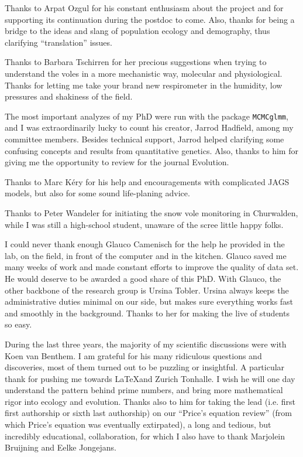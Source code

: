 Thanks to Arpat Ozgul for his constant enthusiasm about the project and for supporting its continuation during the postdoc to come. Also, thanks for being a bridge to the ideas and slang of population ecology and demography, thus clarifying ``translation'' issues. 

Thanks to Barbara Tschirren for her precious suggestions when trying to understand the voles in a more mechanistic way, molecular and physiological. Thanks for letting me take your brand new respirometer in the humidity, low pressures and shakiness of the field. 

The most important analyzes of my PhD were run with the package \texttt{MCMCglmm}, and I was extraordinarily lucky to count his creator, Jarrod Hadfield, among my committee members. Besides technical support, Jarrod helped clarifying some confusing concepts and results from quantitative genetics. Also, thanks to him for giving me the opportunity to review for the journal Evolution. 

Thanks to Marc K\'{e}ry for his help and encouragements with complicated JAGS models, but also for some sound life-planing advice. 

Thanks to Peter Wandeler for initiating the snow vole monitoring in Churwalden, while I was still a high-school student, unaware of the scree little happy folks. 

I could never thank enough Glauco Camenisch for the help he provided in the lab, on the field, in front of the computer and in the kitchen. Glauco saved me many weeks of work and made constant efforts to improve the quality of data set. He would deserve to be awarded a good share of this PhD.
With Glauco, the other backbone of the research group is Ursina Tobler. 
Ursina always keeps the administrative duties minimal on our side, but makes sure everything works fast and smoothly in the background. Thanks to her for making the live of students so easy. 

During the last three years, the majority of my scientific discussions were with Koen van Benthem. I am grateful for his many ridiculous questions and discoveries, most of them turned out to be puzzling or insightful. A particular thank for pushing me towards \LaTeX and Zurich Tonhalle. 
I wish he will one day understand the pattern behind prime numbers, and bring more mathematical rigor into ecology and evolution. 
Thanks also to him for taking the lead (i.e. first first authorship or sixth last authorship) on our ``Price's equation review'' (from which Price's equation was eventually extirpated), a long and tedious, but incredibly educational, collaboration, for which I also have to thank Marjolein Bruijning and Eelke Jongejans.

